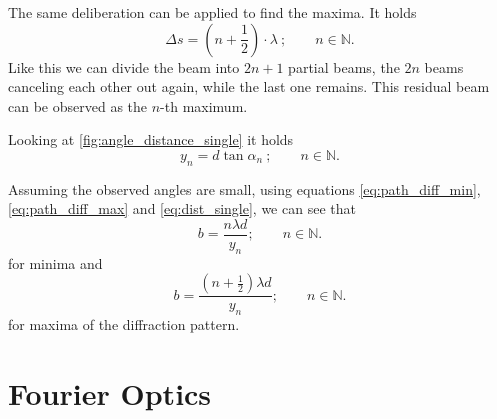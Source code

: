The same deliberation can be applied to find the maxima.
It holds
\begin{equation}\label{eq:path_diff_max}
	\Delta s = \left(n+\frac{1}{2}\right)\cdot\lambda\ ;\qquad n\in\mathbb{N}.
\end{equation}
Like this we can divide the beam into $2n+1$ partial beams, the $2n$ beams canceling each other out again, while the last one remains.
This residual beam can be observed as the $n$-th maximum.

Looking at \autoref{fig:angle_distance_single} it holds
\begin{equation}\label{eq:dist_single}
	y_n = d\tan\alpha_n\ ;\qquad n\in\mathbb{N}.
\end{equation}

Assuming the observed angles are small, using equations \ref{eq:path_diff_min}, \ref{eq:path_diff_max} and \ref{eq:dist_single}, we can see that
\begin{equation}\label{eq:single_slit_minima}
	b = \frac{n\lambda d}{y_n} ;\qquad n\in\mathbb{N}.
\end{equation}
for minima and
\begin{equation}\label{eq:single_slit_maxima}
	b = \frac{\left(n+\frac{1}{2}\right)\lambda d}{y_n} ;\qquad n\in\mathbb{N}.
\end{equation}
for maxima of the diffraction pattern.

\section{Fourier Optics}
